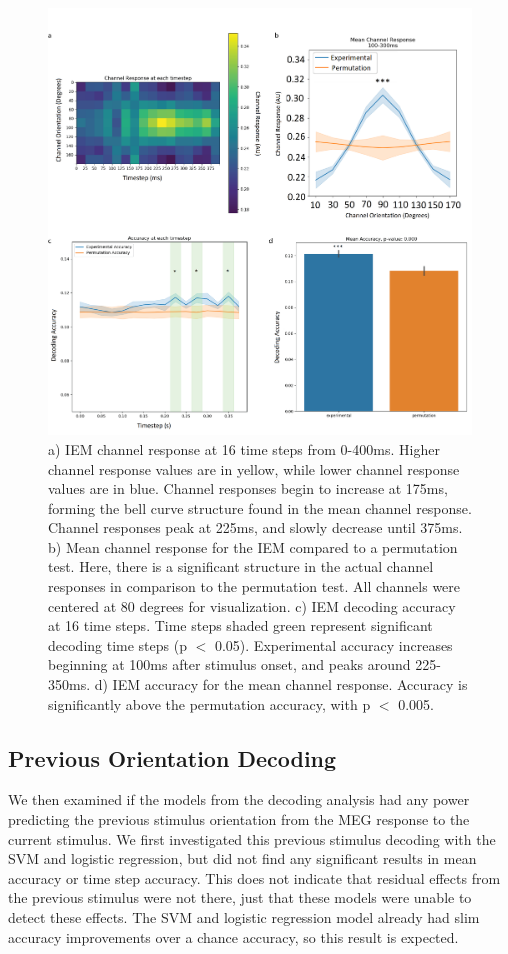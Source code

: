 \documentclass[../main.tex]{subfiles}
\begin{document}
\begin{figure}
    \centering
    \includegraphics[scale=0.175]{figures/results/iem_results.png}
    \caption{a) IEM channel response at 16 time steps from 0-400ms. Higher channel response values are in yellow, while lower channel response values are in blue. Channel responses begin to increase at 175ms, forming the bell curve structure found in the mean channel response. Channel responses peak at 225ms, and slowly decrease until 375ms. b) Mean channel response for the IEM compared to a permutation test. Here, there is a significant structure in the actual channel responses in comparison to the permutation test. All channels were centered at 80 degrees for visualization. c) IEM decoding accuracy at 16 time steps. Time steps shaded green represent significant decoding time steps (p $<$ 0.05). Experimental accuracy increases beginning at 100ms after stimulus onset, and peaks around 225-350ms. d) IEM accuracy for the mean channel response. Accuracy is significantly above the permutation accuracy, with p $<$ 0.005.}
    \label{iem_results}
\end{figure}

\subsection*{Previous Orientation Decoding}
We then examined if the models from the decoding analysis had any power predicting the previous stimulus orientation from the MEG response to the current stimulus. We first investigated this previous stimulus decoding with the SVM and logistic regression, but did not find any significant results in mean accuracy or time step accuracy. This does not indicate that residual effects from the previous stimulus were not there, just that these models were unable to detect these effects. The SVM and logistic regression model already had slim accuracy improvements over a chance accuracy, so this result is expected.
\end{document}
